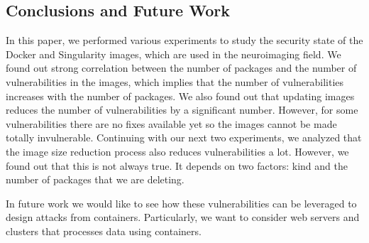 \documentclass[a4paper,num-refs]{oup-contemporary}
\begin{document}
\subsection{Conclusions and Future Work}


In this paper, we performed various experiments to study the security state of the Docker
and Singularity images, which are used in the neuroimaging field. We found out strong correlation
between the number of packages and the number of vulnerabilities in the images, which implies
that the number of vulnerabilities increases with the number of packages. We also found out that
updating images reduces the number of vulnerabilities by a significant number. However, for some
vulnerabilities there are no fixes available yet so the images cannot 
be made totally invulnerable. Continuing with our next two experiments, we analyzed that the
image size reduction process also reduces vulnerabilities a lot. However, we found out that this is not
always true. It depends on two factors: kind and the number of packages that we are
deleting.

In future work we would like to see how these vulnerabilities can be leveraged
to design attacks from containers. Particularly, we want
to consider web servers and clusters that processes data using containers.


\end{document}
